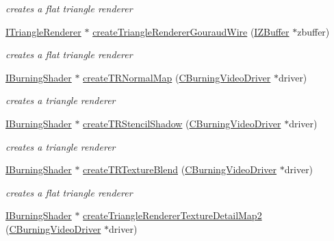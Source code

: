 \begin{DoxyCompactItemize}
\begin{DoxyCompactList}\small\item\em creates a flat triangle renderer \end{DoxyCompactList}\item 
\hyperlink{classirr_1_1video_1_1_i_triangle_renderer}{I\-Triangle\-Renderer} $\ast$ \hyperlink{namespaceirr_1_1video_a717f3c9e22bdfe2572724708af2b0a85}{create\-Triangle\-Renderer\-Gouraud\-Wire} (\hyperlink{classirr_1_1video_1_1_i_z_buffer}{I\-Z\-Buffer} $\ast$zbuffer)
\begin{DoxyCompactList}\small\item\em creates a flat triangle renderer \end{DoxyCompactList}\item 
\hyperlink{classirr_1_1video_1_1_i_burning_shader}{I\-Burning\-Shader} $\ast$ \hyperlink{namespaceirr_1_1video_a9668bff0cc64eba0c28413a5e40f5463}{create\-T\-R\-Normal\-Map} (\hyperlink{classirr_1_1video_1_1_c_burning_video_driver}{C\-Burning\-Video\-Driver} $\ast$driver)
\begin{DoxyCompactList}\small\item\em creates a triangle renderer \end{DoxyCompactList}\item 
\hyperlink{classirr_1_1video_1_1_i_burning_shader}{I\-Burning\-Shader} $\ast$ \hyperlink{namespaceirr_1_1video_ae7fce77440b30748f78d0776204b8394}{create\-T\-R\-Stencil\-Shadow} (\hyperlink{classirr_1_1video_1_1_c_burning_video_driver}{C\-Burning\-Video\-Driver} $\ast$driver)
\begin{DoxyCompactList}\small\item\em creates a triangle renderer \end{DoxyCompactList}\item 
\hyperlink{classirr_1_1video_1_1_i_burning_shader}{I\-Burning\-Shader} $\ast$ \hyperlink{namespaceirr_1_1video_aaf7b3d5cd7edbc65a5c8560ace910f20}{create\-T\-R\-Texture\-Blend} (\hyperlink{classirr_1_1video_1_1_c_burning_video_driver}{C\-Burning\-Video\-Driver} $\ast$driver)
\begin{DoxyCompactList}\small\item\em creates a flat triangle renderer \end{DoxyCompactList}\item 
\hyperlink{classirr_1_1video_1_1_i_burning_shader}{I\-Burning\-Shader} $\ast$ \hyperlink{namespaceirr_1_1video_ac52648c07d9801a2a579a5f72591c3b3}{create\-Triangle\-Renderer\-Texture\-Detail\-Map2} (\hyperlink{classirr_1_1video_1_1_c_burning_video_driver}{C\-Burning\-Video\-Driver} $\ast$driver)

\end{DoxyCompactItemize}
